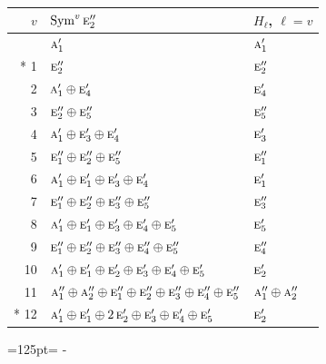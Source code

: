 \documentclass[10pt,a4paper]{article}
\newcommand{\needspace}[1]{\par\penalty-100\begingroup\dimen0=#1\relax\dimen2=\pagegoal
  \advance\dimen2-\pagetotal\ifdim\dimen0>\dimen2\relax\ifdim\dimen2>0pt\vfil\break\fi\fi
  \endgroup}
\numberwithin{equation}{section}
\newcommand{\irr}[1]{\text{\normalfont\scshape #1}}
\begin{document}
{\small\begin{longtable}{@{}rll@{}}\toprule
$v$ & $\operatorname{Sym}^{v}\irr{e}_{2}''$ & $H_\ell$, $\ell = v$\\\midrule\endhead
\bottomrule\endfoot\endlastfoot
0 & $\irr{a}_{1}'$ & $\irr{a}_{1}'$\\*
1 & $\irr{e}_{2}''$ & $\irr{e}_{2}''$\\
2 & $\irr{a}_{1}' \oplus \irr{e}_{4}'$ & $\irr{e}_{4}'$\\
3 & $\irr{e}_{2}'' \oplus \irr{e}_{5}''$ & $\irr{e}_{5}''$\\
4 & $\irr{a}_{1}' \oplus \irr{e}_{3}' \oplus \irr{e}_{4}'$ & $\irr{e}_{3}'$\\
5 & $\irr{e}_{1}'' \oplus \irr{e}_{2}'' \oplus \irr{e}_{5}''$ & $\irr{e}_{1}''$\\
6 & $\irr{a}_{1}' \oplus \irr{e}_{1}' \oplus \irr{e}_{3}' \oplus \irr{e}_{4}'$ & $\irr{e}_{1}'$\\
7 & $\irr{e}_{1}'' \oplus \irr{e}_{2}'' \oplus \irr{e}_{3}'' \oplus \irr{e}_{5}''$ & $\irr{e}_{3}''$\\
8 & $\irr{a}_{1}' \oplus \irr{e}_{1}' \oplus \irr{e}_{3}' \oplus \irr{e}_{4}' \oplus \irr{e}_{5}'$ & $\irr{e}_{5}'$\\
9 & $\irr{e}_{1}'' \oplus \irr{e}_{2}'' \oplus \irr{e}_{3}'' \oplus \irr{e}_{4}'' \oplus \irr{e}_{5}''$ & $\irr{e}_{4}''$\\
10 & $\irr{a}_{1}' \oplus \irr{e}_{1}' \oplus \irr{e}_{2}' \oplus \irr{e}_{3}' \oplus \irr{e}_{4}' \oplus \irr{e}_{5}'$ & $\irr{e}_{2}'$\\
11 & $\irr{a}_{1}'' \oplus \irr{a}_{2}'' \oplus \irr{e}_{1}'' \oplus \irr{e}_{2}'' \oplus \irr{e}_{3}'' \oplus \irr{e}_{4}'' \oplus \irr{e}_{5}''$ & $\irr{a}_{1}'' \oplus \irr{a}_{2}''$\\*
12 & $\irr{a}_{1}' \oplus \irr{e}_{1}' \oplus 2\,\irr{e}_{2}' \oplus \irr{e}_{3}' \oplus \irr{e}_{4}' \oplus \irr{e}_{5}'$ & $\irr{e}_{2}'$\\
\bottomrule\end{longtable}}
\needspace{125pt}
\end{document}
